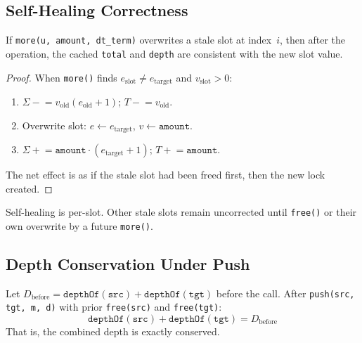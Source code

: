 \documentclass[10pt,a4paper,twocolumn]{article}
\begin{document}
\subsection{Self-Healing Correctness}

\begin{theorem}
\label{thm:self-healing}
If \texttt{more(u, amount, dt\_term)} overwrites a stale slot at index~$i$, then after the operation, the cached \texttt{total} and \texttt{depth} are consistent with the new slot value.
\end{theorem}

\begin{proof}
When \texttt{more()} finds $e_{\text{slot}} \neq e_{\text{target}}$ and $v_{\text{slot}} > 0$:
\begin{enumerate}[nosep]
\item $\Sigma \mathrel{-}= v_{\text{old}}(e_{\text{old}}{+}1)$; $T \mathrel{-}= v_{\text{old}}$.
\item Overwrite slot: $e \leftarrow e_{\text{target}}$, $v \leftarrow \texttt{amount}$.
\item $\Sigma \mathrel{+}= \texttt{amount} \cdot (e_{\text{target}}{+}1)$; $T \mathrel{+}= \texttt{amount}$.
\end{enumerate}
The net effect is as if the stale slot had been freed first, then the new lock created.
\end{proof}

\begin{remark}
Self-healing is per-slot. Other stale slots remain uncorrected until \texttt{free()} or their own overwrite by a future \texttt{more()}.
\end{remark}

\subsection{Depth Conservation Under Push}

\begin{theorem}
\label{thm:push-conservation}
Let $D_{\text{before}} = \texttt{depthOf}(\texttt{src}) + \texttt{depthOf}(\texttt{tgt})$ before the call. After \texttt{push(src, tgt, m, d)} with prior \texttt{free(src)} and \texttt{free(tgt)}:
\[
\texttt{depthOf}(\texttt{src}) + \texttt{depthOf}(\texttt{tgt}) = D_{\text{before}}
\]
That is, the combined depth is exactly conserved.
\end{theorem}
\end{document}
